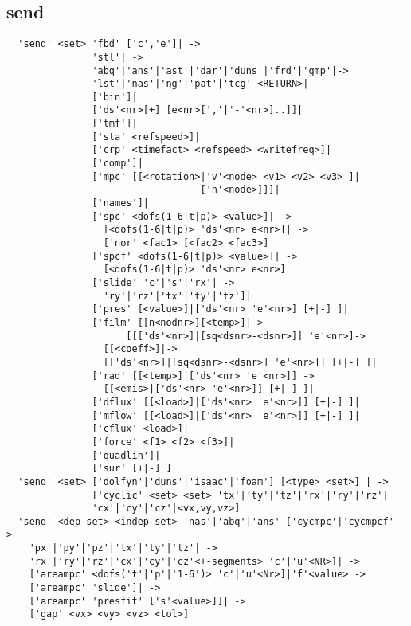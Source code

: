 \documentclass{article}
\begin{document}
\subsection{\label{send}send}
\begin{verbatim}
  'send' <set> 'fbd' ['c','e']| ->
               'stl'| ->
               'abq'|'ans'|'ast'|'dar'|'duns'|'frd'|'gmp'|->
               'lst'|'nas'|'ng'|'pat'|'tcg' <RETURN>|
               ['bin']|
               ['ds'<nr>[+] [e<nr>[','|'-'<nr>]..]]|
               ['tmf']|
               ['sta' <refspeed>]|
               ['crp' <timefact> <refspeed> <writefreq>]|
               ['comp']|
               ['mpc' [[<rotation>|'v'<node> <v1> <v2> <v3> ]|
                                  ['n'<node>]]]|
               ['names']|
               ['spc' <dofs(1-6|t|p)> <value>]| ->
                 [<dofs(1-6|t|p)> 'ds'<nr> e<nr>]| ->
                 ['nor' <fac1> [<fac2> <fac3>]
               ['spcf' <dofs(1-6|t|p)> <value>]| ->
                 [<dofs(1-6|t|p)> 'ds'<nr> e<nr>]
               ['slide' 'c'|'s'|'rx'| ->
                 'ry'|'rz'|'tx'|'ty'|'tz']|
               ['pres' [<value>]|['ds'<nr> 'e'<nr>] [+|-] ]|
               ['film' [[n<nodnr>][<temp>]|->
                     [[['ds'<nr>]|[sq<dsnr>-<dsnr>]] 'e'<nr>]->
                 [[<coeff>]|->
                 [['ds'<nr>]|[sq<dsnr>-<dsnr>] 'e'<nr>]] [+|-] ]| 
               ['rad' [[<temp>]|['ds'<nr> 'e'<nr>]] ->
                 [[<emis>|['ds'<nr> 'e'<nr>]] [+|-] ]|
               ['dflux' [[<load>]|['ds'<nr> 'e'<nr>]] [+|-] ]|
               ['mflow' [[<load>]|['ds'<nr> 'e'<nr>]] [+|-] ]|
               ['cflux' <load>]| 
               ['force' <f1> <f2> <f3>]|
               ['quadlin']|
               ['sur' [+|-] ]
  'send' <set> ['dolfyn'|'duns'|'isaac'|'foam'] [<type> <set>] | ->
               ['cyclic' <set> <set> 'tx'|'ty'|'tz'|'rx'|'ry'|'rz'|
               'cx'|'cy'|'cz'|<vx,vy,vz>] 
  'send' <dep-set> <indep-set> 'nas'|'abq'|'ans' ['cycmpc'|'cycmpcf' ->
    'px'|'py'|'pz'|'tx'|'ty'|'tz'| ->
    'rx'|'ry'|'rz'|'cx'|'cy'|'cz'<+-segments> 'c'|'u'<NR>]| ->
    ['areampc' <dofs('t'|'p'|'1-6')> 'c'|'u'<Nr>]|'f'<value> ->
    ['areampc' 'slide']| ->
    ['areampc' 'presfit' ['s'<value>]]| ->
    ['gap' <vx> <vy> <vz> <tol>] 
\end{verbatim}
\end{document}
